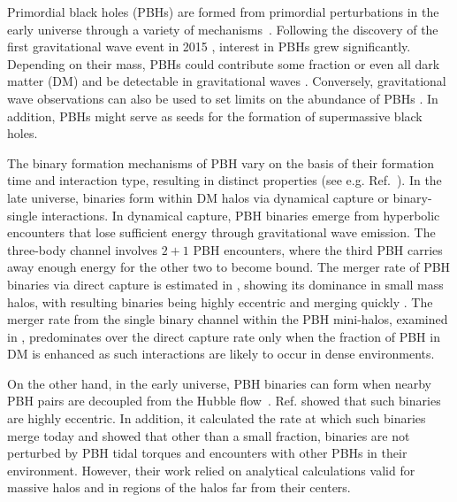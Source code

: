 \documentclass[aps, prd, reprint, nofootinbib]{revtex4-2}
\begin{document}
Primordial black holes (PBHs) are formed from primordial perturbations in the early universe through a variety of mechanisms~\cite{PBH_1, PBH_2, PBH_3, PBH_4}. Following the discovery of the first gravitational wave event in 2015 \cite{LIGOScientific:2016aoc}, interest in PBHs grew significantly. Depending on their mass, PBHs could contribute some fraction or even all dark matter (DM) and be detectable in gravitational waves \cite{Bird:2016dcv, PBH_DM_1,PBH_DM_2,PBH_DM_3, Kovetz:2016kpi, Clesse:2020ghq, Clesse:2018ogk}. 
Conversely, gravitational wave observations can also be used to set limits on the abundance of PBHs \cite{early_PBH_1, PBBH1, Kovetz:2017rvv, Morras:2023jvb, LIGOScientific:2022hai}.
In addition, PBHs might serve as seeds for the formation of supermassive black holes\cite{PBH_super_1,PBH_super_2,PBH_super_3,PBH_super_4}.


The binary formation mechanisms of PBH vary on the basis of their formation time and interaction type, resulting in distinct properties (see e.g. Ref.~\cite{PBH_channels}). In the late universe, binaries form within DM halos via dynamical capture or binary-single interactions. In dynamical capture, PBH binaries emerge from hyperbolic encounters that lose sufficient energy through gravitational wave emission. The three-body channel involves $2+1$ PBH encounters, where the third PBH carries away enough energy for the other two to become bound. 
The merger rate of PBH binaries via direct capture is estimated in \cite{Bird:2016dcv, Mandic}, showing its dominance in small mass halos, with resulting binaries being highly eccentric and merging quickly \cite{Cholis:2016kqi}. The merger rate from the single binary channel within the PBH mini-halos, examined in \cite{Kritos}, predominates over the direct capture rate only when the fraction of PBH in DM is enhanced as such interactions are likely to occur in dense environments.

On the other hand, in the early universe, PBH binaries can form when nearby PBH pairs are decoupled from the Hubble flow~\cite{early_PBH_1,PBBH1}. Ref.{\cite{PBBH1}} 
showed that such binaries are highly eccentric. In addition, it calculated the rate at which such binaries merge today and showed that other than a small fraction, binaries are not perturbed by PBH tidal torques and encounters with other PBHs in their environment. However, their work relied on analytical calculations valid for massive halos and in regions of the halos far from their centers. 
\end{document}
